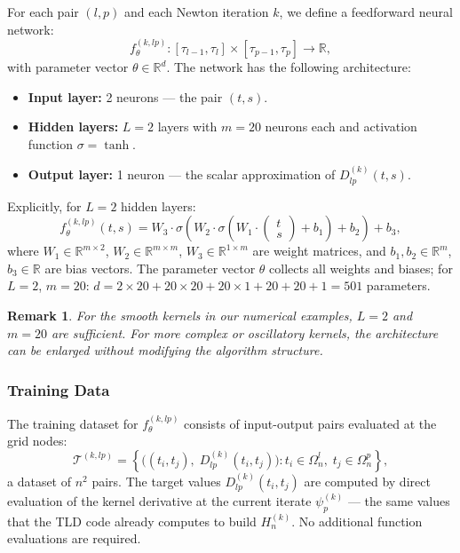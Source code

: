 \documentclass[12pt, a4paper]{article}
\newtheorem{remark}[theorem]{Remark}
\newcommand{\Hn}{H_{n}^{(k)}}
\newcommand{\ftheta}{f_{\theta}^{(k,lp)}}
\newcommand{\R}{\mathbb{R}}
\begin{document}
For each pair $(l,p)$ and each Newton iteration $k$, we
define a feedforward neural network:
\begin{equation}
  \ftheta : [\tau_{l-1}, \tau_l] \times [\tau_{p-1}, \tau_p]
  \to \R,
  \label{eq:network}
\end{equation}
with parameter vector $\theta \in \R^d$.
The network has the following architecture:
\begin{itemize}
  \item \textbf{Input layer:} 2 neurons --- the pair $(t, s)$.
  \item \textbf{Hidden layers:} $L = 2$ layers with $m = 20$
    neurons each and activation function $\sigma = \tanh$.
  \item \textbf{Output layer:} 1 neuron --- the scalar
    approximation of $D_{lp}^{(k)}(t, s)$.
\end{itemize}

Explicitly, for $L = 2$ hidden layers:
\begin{equation}
  \ftheta(t, s) =
  W_3 \cdot \sigma\!\left(
    W_2 \cdot \sigma\!\left(
      W_1 \cdot \begin{pmatrix} t \\ s \end{pmatrix} + b_1
    \right) + b_2
  \right) + b_3,
  \label{eq:net_explicit}
\end{equation}
where $W_1 \in \R^{m \times 2}$, $W_2 \in \R^{m \times m}$,
$W_3 \in \R^{1 \times m}$ are weight matrices, and
$b_1, b_2 \in \R^m$, $b_3 \in \R$ are bias vectors.
The parameter vector $\theta$ collects all weights and biases;
for $L = 2$, $m = 20$: $d = 2 \times 20 + 20 \times 20
+ 20 \times 1 + 20 + 20 + 1 = 501$ parameters.

\begin{remark}
  For the smooth kernels in our numerical examples, $L = 2$
  and $m = 20$ are sufficient. For more complex or oscillatory
  kernels, the architecture can be enlarged without modifying
  the algorithm structure.
\end{remark}

\subsubsection{Training Data}

The training dataset for $\ftheta$ consists of input-output
pairs evaluated at the grid nodes:
\begin{equation}
  \mathcal{T}^{(k,lp)} = \left\{
    \bigl( (t_i, t_j),\; D_{lp}^{(k)}(t_i, t_j) \bigr)
    : t_i \in \Omega_n^l,\; t_j \in \Omega_n^p
  \right\},
  \label{eq:training_data}
\end{equation}
a dataset of $n^2$ pairs.
The target values $D_{lp}^{(k)}(t_i, t_j)$ are computed by
direct evaluation of the kernel derivative at the current
iterate $\psi_p^{(k)}$ --- the same values that the TLD code
already computes to build $\Hn$.
No additional function evaluations are required.
\end{document}
